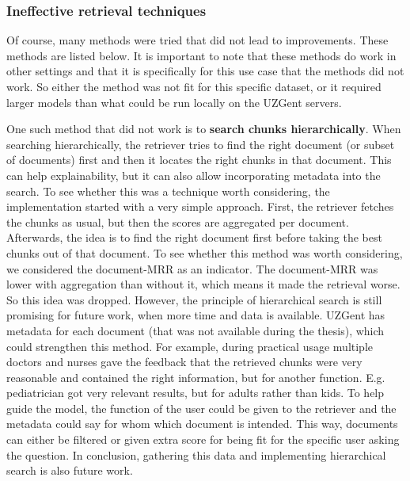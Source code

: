 \subsubsection{Ineffective retrieval techniques}
Of course, many methods were tried that did not lead to improvements. These methods are listed below. It is important to note that these methods do work in other settings and that it is specifically for this use case that the methods did not work. So either the method was not fit for this specific dataset, or it required larger models than what could be run locally on the UZGent servers.

\FloatBarrier

One such method that did not work is to \textbf{search chunks hierarchically}. When searching hierarchically, the retriever tries to find the right document (or subset of documents) first and then it locates the right chunks in that document. This can help explainability, but it can also allow incorporating metadata into the search. To see whether this was a technique worth considering, the implementation started with a very simple approach. First, the retriever fetches the chunks as usual, but then the scores are aggregated per document. Afterwards, the idea is to find the right document first before taking the best chunks out of that document. To see whether this method was worth considering, we considered the document-MRR as an indicator. The document-MRR was lower with aggregation than without it, which means it made the retrieval worse. So this idea was dropped. However, the principle of hierarchical search is still promising for future work, when more time and data is available. UZGent has metadata for each document (that was not available during the thesis), which could strengthen this method. For example, during practical usage multiple doctors and nurses gave the feedback that the retrieved chunks were very reasonable and contained the right information, but for another function. E.g. pediatrician got very relevant results, but for adults rather than kids. To help guide the model, the function of the user could be given to the retriever and the metadata could say for whom which document is intended. This way, documents can either be filtered or given extra score for being fit for the specific user asking the question. In conclusion, gathering this data and implementing hierarchical search is also future work.

